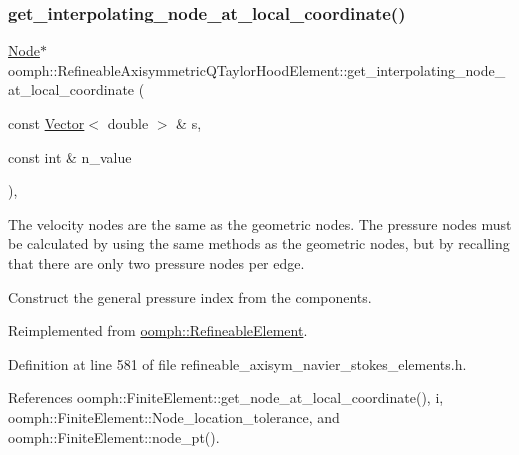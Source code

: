 \subsubsection{\texorpdfstring{get\+\_\+interpolating\+\_\+node\+\_\+at\+\_\+local\+\_\+coordinate()}{get\_interpolating\_node\_at\_local\_coordinate()}}
{\footnotesize\ttfamily \hyperlink{classoomph_1_1Node}{Node}$\ast$ oomph\+::\+Refineable\+Axisymmetric\+Q\+Taylor\+Hood\+Element\+::get\+\_\+interpolating\+\_\+node\+\_\+at\+\_\+local\+\_\+coordinate (\begin{DoxyParamCaption}\item[{const \hyperlink{classoomph_1_1Vector}{Vector}$<$ double $>$ \&}]{s,  }\item[{const int \&}]{n\+\_\+value }\end{DoxyParamCaption})\hspace{0.3cm}{\ttfamily [inline]}, {\ttfamily [virtual]}}



The velocity nodes are the same as the geometric nodes. The pressure nodes must be calculated by using the same methods as the geometric nodes, but by recalling that there are only two pressure nodes per edge. 

Construct the general pressure index from the components. 

Reimplemented from \hyperlink{classoomph_1_1RefineableElement_ad920e66c00888c450f926f08c7793f78}{oomph\+::\+Refineable\+Element}.



Definition at line 581 of file refineable\+\_\+axisym\+\_\+navier\+\_\+stokes\+\_\+elements.\+h.



References oomph\+::\+Finite\+Element\+::get\+\_\+node\+\_\+at\+\_\+local\+\_\+coordinate(), i, oomph\+::\+Finite\+Element\+::\+Node\+\_\+location\+\_\+tolerance, and oomph\+::\+Finite\+Element\+::node\+\_\+pt().

\mbox{\label{classoomph_1_1RefineableAxisymmetricQTaylorHoodElement_a20d24729129ee059ab89b407c02d1cb8}} 
